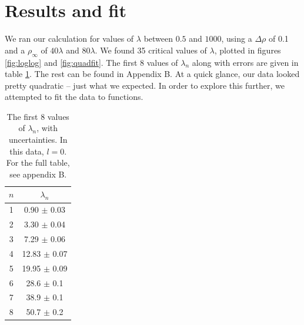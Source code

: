 \documentclass[12pt,twoside]{reedthesis}
\begin{document}
\section{Results and fit}
We ran our calculation for values of $\lambda$ between $0.5$ and $1000$, using a $\Delta \rho$ of 0.1 and a $\rho_{\infty}$ of $40 \lambda$ and $80 \lambda$. We found 35 critical values of $\lambda$, plotted in figures \ref{fig:loglog} and \ref{fig:quadfit}. The first 8 values of $\lambda_n$ along with errors are given in table \ref{tab:l0short}. The rest can be found in Appendix B. At a quick glance, our data looked pretty quadratic -- just what we expected. In order to explore this further, we attempted to fit the data to functions.

\begin{table}[h]
\centering
	\caption{The first 8 values of $\lambda_n$, with uncertainties. In this data, $l = 0$. For the full table, see appendix B.}
	\label{tab:l0short}
	\begin{tabular}{c|c}
		$n$	& $\lambda_n$	 \\
\hline
		1	& 0.90	$\pm$ 0.03\\
		2	& 3.30	$\pm$ 0.04\\
		3	& 7.29	$\pm$ 0.06\\
		4	& 12.83	$\pm$ 0.07\\
		5	& 19.95	$\pm$ 0.09\\
		6	& 28.6	$\pm$ 0.1\\
		7	& 38.9	$\pm$ 0.1\\
		8	& 50.7	$\pm$ 0.2
	\end{tabular}
\end{table}
\end{document}

